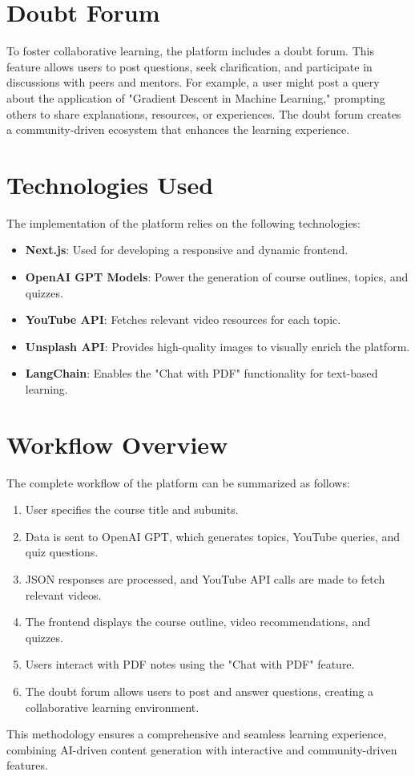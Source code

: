 \section{Doubt Forum}
To foster collaborative learning, the platform includes a doubt forum. This feature allows users to post questions, seek clarification, and participate in discussions with peers and mentors. For example, a user might post a query about the application of "Gradient Descent in Machine Learning," prompting others to share explanations, resources, or experiences. The doubt forum creates a community-driven ecosystem that enhances the learning experience.

\section{Technologies Used}
The implementation of the platform relies on the following technologies:
\begin{itemize}
    \item \textbf{Next.js}: Used for developing a responsive and dynamic frontend.
    \item \textbf{OpenAI GPT Models}: Power the generation of course outlines, topics, and quizzes.
    \item \textbf{YouTube API}: Fetches relevant video resources for each topic.
    \item \textbf{Unsplash API}: Provides high-quality images to visually enrich the platform.
    \item \textbf{LangChain}: Enables the "Chat with PDF" functionality for text-based learning.
\end{itemize}

\section{Workflow Overview}
The complete workflow of the platform can be summarized as follows:
\begin{enumerate}
    \item User specifies the course title and subunits.
    \item Data is sent to OpenAI GPT, which generates topics, YouTube queries, and quiz questions.
    \item JSON responses are processed, and YouTube API calls are made to fetch relevant videos.
    \item The frontend displays the course outline, video recommendations, and quizzes.
    \item Users interact with PDF notes using the "Chat with PDF" feature.
    \item The doubt forum allows users to post and answer questions, creating a collaborative learning environment.
\end{enumerate}

This methodology ensures a comprehensive and seamless learning experience, combining AI-driven content generation with interactive and community-driven features.